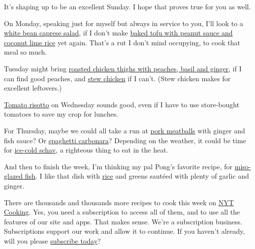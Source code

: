 It's shaping up to be an excellent Sunday. I hope that proves true for
you as well.

On Monday, speaking just for myself but always in service to you, I'll
look to a
\href{https://cooking.nytimes3xbfgragh.onion/recipes/1021273-white-bean-caprese-salad}{white
bean caprese salad}, if I don't make
\href{https://cooking.nytimes3xbfgragh.onion/recipes/1020530-baked-tofu-with-peanut-sauce-and-coconut-lime-rice}{baked
tofu with peanut sauce and coconut lime rice} yet again. That's a rut I
don't mind occupying, to cook that meal so much.

Tuesday might bring
\href{https://cooking.nytimes3xbfgragh.onion/recipes/1012681-roasted-chicken-thighs-with-peaches-basil-and-ginger}{roasted
chicken thighs with peaches, basil and ginger}, if I can find good
peaches, and
\href{https://cooking.nytimes3xbfgragh.onion/recipes/1017778-stew-chicken}{stew
chicken} if I can't. (Stew chicken makes for excellent leftovers.)

\href{https://cooking.nytimes3xbfgragh.onion/recipes/1020378-tomato-risotto}{Tomato
risotto} on Wednesday sounds good, even if I have to use store-bought
tomatoes to save my crop for lunches.

For Thursday, maybe we could all take a run at
\href{https://cooking.nytimes3xbfgragh.onion/recipes/1019764-pork-meatballs-with-ginger-and-fish-sauce}{pork
meatballs} with ginger and fish sauce? Or
\href{https://cooking.nytimes3xbfgragh.onion/recipes/12965-spaghetti-carbonara}{spaghetti
carbonara}? Depending on the weather, it could be time for
\href{https://cooking.nytimes3xbfgragh.onion/recipes/1018801-ice-cold-schav}{ice-cold
schav}, a righteous thing to eat in the heat.

And then to finish the week, I'm thinking my pal Pong's favorite recipe,
for
\href{https://cooking.nytimes3xbfgragh.onion/recipes/1015115-miso-glazed-fish}{miso-glazed
fish}. I like that dish with
\href{https://cooking.nytimes3xbfgragh.onion/guides/49-how-to-make-rice}{rice}
and greens sautéed with plenty of garlic and ginger.

There are thousands and thousands more recipes to cook this week on
\href{https://cooking.nytimes3xbfgragh.onion/}{NYT Cooking}. Yes, you
need a subscription to access all of them, and to use all the features
of our site and apps. That makes sense. We're a subscription business.
Subscriptions support our work and allow it to continue. If you haven't
already, will you please
\href{https://www.nytimes3xbfgragh.onion/subscription/cooking.html?campaignId=6XQHR}{subscribe
today}?

